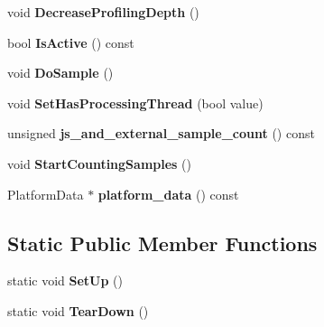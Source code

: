 \begin{DoxyCompactItemize}
\item 
\hypertarget{classv8_1_1internal_1_1_sampler_a8d407fc72cae1f18f83cdac31f6210a9}{}void {\bfseries Decrease\+Profiling\+Depth} ()\label{classv8_1_1internal_1_1_sampler_a8d407fc72cae1f18f83cdac31f6210a9}

\item 
\hypertarget{classv8_1_1internal_1_1_sampler_ae07953e625ebaed8e9bb9255cebf11b6}{}bool {\bfseries Is\+Active} () const \label{classv8_1_1internal_1_1_sampler_ae07953e625ebaed8e9bb9255cebf11b6}

\item 
\hypertarget{classv8_1_1internal_1_1_sampler_ad0fdfdc8fe6355d20c14fc7dd0f00804}{}void {\bfseries Do\+Sample} ()\label{classv8_1_1internal_1_1_sampler_ad0fdfdc8fe6355d20c14fc7dd0f00804}

\item 
\hypertarget{classv8_1_1internal_1_1_sampler_a169a37b12419bf65e575ce9d3050816a}{}void {\bfseries Set\+Has\+Processing\+Thread} (bool value)\label{classv8_1_1internal_1_1_sampler_a169a37b12419bf65e575ce9d3050816a}

\item 
\hypertarget{classv8_1_1internal_1_1_sampler_aa2d68752e0bad2fcbb7e95b2487294ad}{}unsigned {\bfseries js\+\_\+and\+\_\+external\+\_\+sample\+\_\+count} () const \label{classv8_1_1internal_1_1_sampler_aa2d68752e0bad2fcbb7e95b2487294ad}

\item 
\hypertarget{classv8_1_1internal_1_1_sampler_ac96ec0272e98d92db1dbaaaa0c1bfd76}{}void {\bfseries Start\+Counting\+Samples} ()\label{classv8_1_1internal_1_1_sampler_ac96ec0272e98d92db1dbaaaa0c1bfd76}

\item 
\hypertarget{classv8_1_1internal_1_1_sampler_ac489d152f06977d73910ab3a8f9c35e3}{}Platform\+Data $\ast$ {\bfseries platform\+\_\+data} () const \label{classv8_1_1internal_1_1_sampler_ac489d152f06977d73910ab3a8f9c35e3}

\end{DoxyCompactItemize}
\subsection*{Static Public Member Functions}
\begin{DoxyCompactItemize}
\item 
\hypertarget{classv8_1_1internal_1_1_sampler_abba50ae6383b37c6033d9457ca0413c0}{}static void {\bfseries Set\+Up} ()\label{classv8_1_1internal_1_1_sampler_abba50ae6383b37c6033d9457ca0413c0}

\item 
\hypertarget{classv8_1_1internal_1_1_sampler_ad5079e4708095bd40d857a46fe2880b6}{}static void {\bfseries Tear\+Down} ()\label{classv8_1_1internal_1_1_sampler_ad5079e4708095bd40d857a46fe2880b6}

\end{DoxyCompactItemize}
